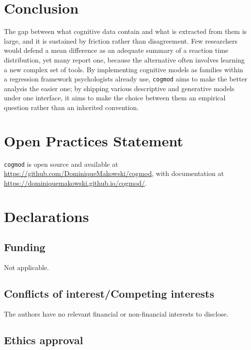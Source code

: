 \documentclass[
  jou,
  floatsintext,
  longtable,
  nolmodern,
  notxfonts,
  notimes,
  12pt,
  colorlinks=true,linkcolor=blue,citecolor=blue,urlcolor=blue]{apa7}
\begin{document}
\section{Conclusion}\label{conclusion}

The gap between what cognitive data contain and what is extracted from
them is large, and it is sustained by friction rather than disagreement.
Few researchers would defend a mean difference as an adequate summary of
a reaction time distribution, yet many report one, because the
alternative often involves learning a new complex set of tools. By
implementing cognitive models as families within a regression framework
psychologists already use, \texttt{cogmod} aims to make the better
analysis the easier one; by shipping various descriptive and generative
models under one interface, it aims to make the choice between them an
empirical question rather than an inherited convention.

\section{Open Practices Statement}\label{open-practices-statement}

\texttt{cogmod} is open source and available at
\url{https://github.com/DominiqueMakowski/cogmod}, with documentation at
\url{https://dominiquemakowski.github.io/cogmod/}.

\section{Declarations}\label{declarations}

\subsection{Funding}\label{funding}

Not applicable.

\subsection{Conflicts of interest/Competing
interests}\label{conflicts-of-interestcompeting-interests}

The authors have no relevant financial or non-financial interests to
disclose.

\subsection{Ethics approval}\label{ethics-approval}
\end{document}
